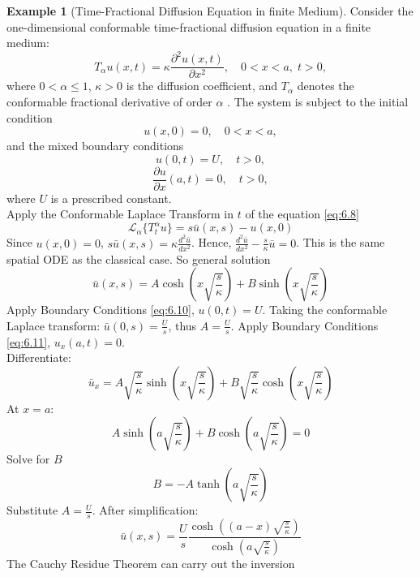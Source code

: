 \documentclass[two side,reqno,12pt]{amsart}
\numberwithin{equation}{section}
\theoremstyle{definition}
\newtheorem{example}[lemma]{Example}
\begin{document}
\begin{example}[Time-Fractional Diffusion Equation in finite Medium]
 Consider the one-dimensional conformable time-fractional diffusion equation in a finite medium:
\begin{equation}
T_\alpha u(x,t) = \kappa \frac{\partial^2 u(x,t)}{\partial x^2}, \quad 0 < x < a, \; t > 0,
\label{eq:6.8}
\end{equation}
where \(0 < \alpha \leq 1\), \(\kappa > 0\) is the diffusion coefficient, and \(T_\alpha\) denotes the conformable fractional derivative of order \(\alpha\) .
The system is subject to the initial condition
\begin{equation}
u(x,0) = 0, \quad 0 < x < a,
\end{equation}
and the mixed boundary conditions
\begin{equation}
    u(0,t) = U, \quad t > 0, 
    \label{eq:6.10}
\end{equation}
\begin{equation}
    \frac{\partial u}{\partial x}(a,t) = 0, \quad t > 0,
\label{eq:6.11}
\end{equation}
where \(U\) is a prescribed constant.\\
Apply the Conformable Laplace Transform in \(t\) of the equation \eqref{eq:6.8}
\[
    \mathcal{L}_\alpha\{T_t^\alpha u\} = s\bar{u}(x,s) - u(x,0)
\]
Since \(u(x,0) = 0\),
\(
s\bar{u}(x,s) = \kappa \frac{d^2\bar{u}}{dx^2}
\).
Hence,
\(
\frac{d^2\bar{u}}{dx^2} - \frac{s}{\kappa}\bar{u} = 0
\). This is the same spatial ODE as the classical case.
So general solution
\[
    \bar{u}(x,s) = A \cosh\left(x \sqrt{\frac{s}{\kappa}}\right) + B \sinh\left(x \sqrt{\frac{s}{\kappa}}\right)
\]
Apply Boundary Conditions \eqref{eq:6.10}, \(u(0,t) = U\).
Taking the conformable Laplace transform:
\(\bar{u}(0,s) = \frac{U}{s}\), thus
\(A = \frac{U}{s}\).
Apply Boundary Conditions \eqref{eq:6.11}, \(u_x(a,t) = 0\).\\
Differentiate:
\[
    \bar{u}_x = A \sqrt{\frac{s}{\kappa}} \sinh\left(x \sqrt{\frac{s}{\kappa}}\right) + B \sqrt{\frac{s}{\kappa}} \cosh\left(x \sqrt{\frac{s}{\kappa}}\right)
\]
At \(x=a:\)
\[
    A \sinh\left(a \sqrt{\frac{s}{\kappa}}\right) + B \cosh\left(a \sqrt{\frac{s}{\kappa}}\right) = 0
\]
Solve for \(B\)
\[
    B = -A \tanh\left(a \sqrt{\frac{s}{\kappa}}\right)
\]
Substitute \(A = \frac{U}{s}\).
After simplification:
\[
  \bar{u}(x,s) = \frac{U}{s} \frac{\cosh\left((a-x) \sqrt{\frac{s}{\kappa}}\right)}{\cosh\left(a \sqrt{\frac{s}{\kappa}}\right)}  
\]
The Cauchy Residue Theorem can carry out the inversion 

\end{example}
\end{document}
